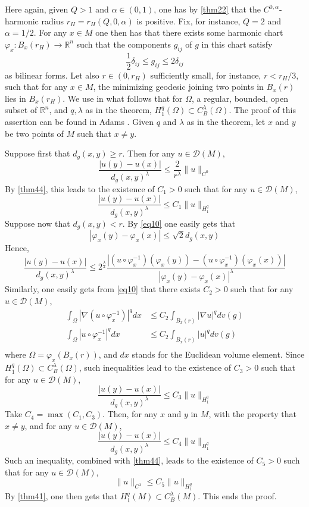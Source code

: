 \documentclass[12pt,hyperref,a4paper,UTF8]{ctexart}
\begin{document}
\begin{Proof}
Here again, given $Q>1$ and $\alpha \in(0,1)$, one has by \autoref{thm22} that the $C^{0, \alpha}$-harmonic radius $r_H=r_H(Q, 0, \alpha)$ is positive. Fix, for instance, $Q=2$ and $\alpha=1 / 2$. For any $x \in M$ one then has that there exists some harmonic chart $\varphi_x: B_x\left(r_H\right) \rightarrow \mathbb{R}^n$ such that the components $g_{i j}$ of $g$ in this chart satisfy
\begin{equation}
\frac{1}{2} \delta_{i j} \leq g_{i j} \leq 2 \delta_{i j}
\label{eq10}
\end{equation}
as bilinear forms. Let also $r \in\left(0, r_H\right)$ sufficiently small, for instance, $r<r_H / 3$, such that for any $x \in M$, the minimizing geodesic joining two points in $B_x(r)$ lies in $B_x\left(r_H\right)$. We use in what follows that for $\Omega$, a regular, bounded, open subset of $\mathbb{R}^n$, and $q, \lambda$ as in the theorem, $H_1^q(\Omega) \subset C_B^\lambda(\Omega)$. The proof of this assertion can be found in Adams \cite{A}. Given $q$ and $\lambda$ as in the theorem, let $x$ and $y$ be two points of $M$ such that $x \neq y$.

\vskip 3pt
Suppose first that $d_g(x, y) \geq r$. Then for any $u \in \mathcal{D}(M)$,
$$
\frac{|u(y)-u(x)|}{d_g(x, y)^\lambda} \leq \frac{2}{r^\lambda}\|u\|_{C^0}
$$
By \autoref{thm44}, this leads to the existence of $C_1>0$ such that for any $u \in \mathcal{D}(M)$,
$$
\frac{|u(y)-u(x)|}{d_g(x, y)^\lambda} \leq C_1\|u\|_{H_1^q}
$$
Suppose now that $d_g(x, y)<r$. By \autoref{eq10} one easily gets that
$$
\left|\varphi_x(y)-\varphi_x(x)\right| \leq \sqrt{2} d_g(x, y)
$$
Hence,
$$
\frac{|u(y)-u(x)|}{d_g(x, y)^\lambda} \leq 2^{\frac{\lambda}{2}} \frac{\left|\left(u \circ \varphi_x^{-1}\right)\left(\varphi_x(y)\right)-\left(u \circ \varphi_x^{-1}\right)\left(\varphi_x(x)\right)\right|}{\left|\varphi_x(y)-\varphi_x(x)\right|^\lambda}
$$
Similarly, one easily gets from \autoref{eq10} that there exists $C_2>0$ such that for any $u \in \mathcal{D}(M)$,
$$
\begin{aligned}
\int_{\Omega}\left|\nabla\left(u \circ \varphi_x^{-1}\right)\right|^q d x &\leq C_2 \int_{B_x(r)}|\nabla u|^q d v(g) \\
\int_{\Omega}\left|u \circ \varphi_x^{-1}\right|^q d x &\leq C_2 \int_{B_x(r)}|u|^q d v(g)\\
\end{aligned}
$$
where $\Omega=\varphi_x\left(B_x(r)\right)$, and $d x$ stands for the Euclidean volume element. Since $H_1^q(\Omega) \subset C_B^\lambda(\Omega)$, such inequalities lead to the existence of $C_3>0$ such that for any $u \in \mathcal{D}(M)$,
$$
\frac{|u(y)-u(x)|}{d_g(x, y)^\lambda} \leq C_3\|u\|_{H_1^q}
$$
Take $C_4=\max \left(C_1, C_3\right)$. Then, for any $x$ and $y$ in $M$, with the property that $x \neq y$, and for any $u \in \mathcal{D}(M)$,
$$
\frac{|u(y)-u(x)|}{d_g(x, y)^\lambda} \leq C_4\|u\|_{H_1^q}
$$
Such an inequality, combined with \autoref{thm44}, leads to the existence of $C_5>0$ such that for any $u \in \mathcal{D}(M)$,
$$
\|u\|_{C^\lambda} \leq C_5\|u\|_{H_1^q}
$$
By \autoref{thm41}, one then gets that $H_1^q(M) \subset C_B^\lambda(M)$. This ends the proof.
\end{Proof}
\end{document}
